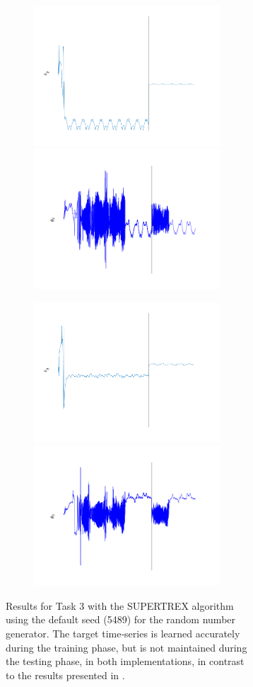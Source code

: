 \begin{figure}
\begin{subfigure}{\textwidth}
\begin{subfigure}{\textwidth}
        \end{subfigure}
        
        
        \textbf{}\begin{subfigure}{\textwidth}
        \centering
        
        \includegraphics[height=0.1\linewidth,width=.45\linewidth]{Figures/MATLAB/ST_T3_Theta2.png}
        \includegraphics[height=0.1\linewidth,width=.45\linewidth]{Figures/Python/ST_T3_Theta2.png}
        
        \end{subfigure}
        
        
        \textbf{}\begin{subfigure}{\textwidth}
        \centering
        
        \includegraphics[height=0.1\linewidth,width=.45\linewidth]{Figures/MATLAB/ST_T3_Theta3.png}
        \includegraphics[height=0.1\linewidth,width=.45\linewidth]{Figures/Python/ST_T3_Theta3.png}
        
        \end{subfigure}
        

    \caption{Results for Task 3 with the SUPERTREX algorithm using the default seed (5489) for the random number generator. The target time‐series is learned accurately during the training phase, but is not maintained during the testing phase, in both implementations, in contrast to the results presented in \cite{pyle2019}.}
    \label{Fig:compTask3ST}
    
    \end{subfigure}
    
    \begin{subfigure}{\textwidth}
        \centering
        

\end{subfigure}
\end{figure}
